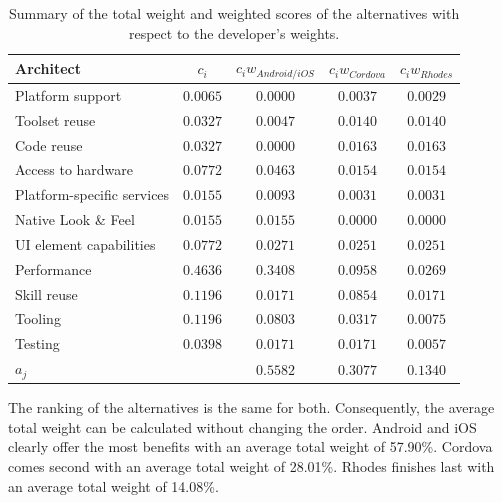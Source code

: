 \begin{table}[h]
    \centering
    \begin{tabular}{lcccc}
        \hline
        \textbf{Architect}         & $c_i$        & $c_i w_{Android/iOS}$ & $c_i w_{Cordova}$  & $c_i w_{Rhodes}$ \\
        \hline
        Platform support           & $0.0065$     & $0.0000$              & $0.0037$           & $0.0029$         \\
        Toolset reuse              & $0.0327$     & $0.0047$              & $0.0140$           & $0.0140$         \\
        Code reuse                 & $0.0327$     & $0.0000$              & $0.0163$           & $0.0163$         \\
        Access to hardware         & $0.0772$     & $0.0463$              & $0.0154$           & $0.0154$         \\
        Platform-specific services & $0.0155$     & $0.0093$              & $0.0031$           & $0.0031$         \\
        Native Look \& Feel        & $0.0155$     & $0.0155$              & $0.0000$           & $0.0000$         \\
        UI element capabilities    & $0.0772$     & $0.0271$              & $0.0251$           & $0.0251$         \\
        Performance                & $0.4636$     & $0.3408$              & $0.0958$           & $0.0269$         \\
        Skill reuse                & $0.1196$     & $0.0171$              & $0.0854$           & $0.0171$         \\
        Tooling                    & $0.1196$     & $0.0803$              & $0.0317$           & $0.0075$         \\
        Testing                    & $0.0398$     & $0.0171$              & $0.0171$           & $0.0057$         \\
        \hline
        $a_j$                      &              & $0.5582$              & $0.3077$           & $0.1340$         \\
        \hline
    \end{tabular}
    \caption{Summary of the total weight and weighted scores of the alternatives with respect to the developer's weights.}
    \label{tab:total:developer}
\end{table}

The ranking of the alternatives is the same for both. Consequently, the average total weight can be calculated without changing the order. Android and iOS clearly offer the most benefits with an average total weight of 57.90\%. Cordova comes second with an average total weight of 28.01\%. Rhodes finishes last with an average total weight of 14.08\%. 

